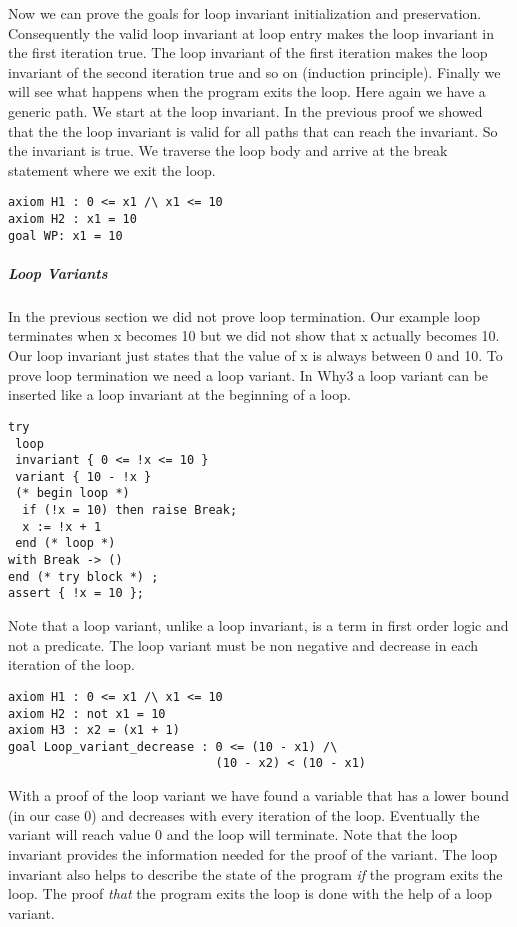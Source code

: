 Now we can prove the goals for loop invariant initialization and 
preservation. Consequently the valid loop invariant at loop entry makes the loop
invariant in the first iteration true. The loop invariant of the first
iteration makes the loop invariant of the second iteration true and so on
(induction principle). 
Finally we will see what happens when the program exits the loop. Here
again we have a generic path. We start at the loop invariant. In the 
previous proof we showed that the the loop invariant is valid for all paths
that can reach the invariant. So the invariant is true. We traverse the 
loop body and arrive at the break statement where we exit the loop.
\begin{lstlisting}
axiom H1 : 0 <= x1 /\ x1 <= 10
axiom H2 : x1 = 10
goal WP: x1 = 10
\end{lstlisting}

\subparagraph{Loop Variants}
In the previous section we did not prove loop termination. Our example
loop terminates when x becomes 10 but we did not show that x actually 
becomes 10. Our loop invariant just states that the value of x is always
between 0 and 10.
To prove loop termination we need a loop variant. In Why3 a loop variant
can be inserted like a loop invariant at the beginning of a loop.
\begin{lstlisting}
try
 loop
 invariant { 0 <= !x <= 10 }
 variant { 10 - !x }
 (* begin loop *)
  if (!x = 10) then raise Break;
  x := !x + 1 
 end (* loop *)
with Break -> ()
end (* try block *) ;
assert { !x = 10 };
\end{lstlisting}
Note that a loop variant, unlike a loop invariant, is a term in first order
logic and not a predicate. The loop variant must be non negative and 
decrease in each iteration of the loop. 
\begin{lstlisting}
axiom H1 : 0 <= x1 /\ x1 <= 10
axiom H2 : not x1 = 10
axiom H3 : x2 = (x1 + 1)
goal Loop_variant_decrease : 0 <= (10 - x1) /\ 
                             (10 - x2) < (10 - x1)
\end{lstlisting}
With a proof of the loop variant we have found a variable that has 
a lower bound (in our case 0) and decreases with every iteration of the
loop. Eventually the variant will reach value 0 and the loop will terminate.
Note that the loop invariant provides the information needed for the proof
of the variant. The loop invariant also helps to describe the state of the
program \emph{if} the program exits the loop. The proof \emph{that} the program exits the
loop is done with the help of a loop variant.
